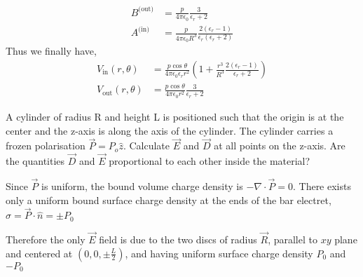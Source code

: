 \documentclass[../main.tex]{subfiles}
\begin{document}
\begin{questions}
\begin{solution}
\begin{align}
		B^\text{(out)} &= \frac{p}{4\pi\epsilon_0}\frac{3}{\epsilon_r+2}\\
		A^\text{(in)} &= \frac{p}{4\pi\epsilon_0R^3}\frac{2(\epsilon_r-1)}{\epsilon_r(\epsilon_r+2)}        
	\end{align}
	Thus we finally have,
	\begin{align}
		V_\text{in}(r,\theta) &= \frac{p\cos\theta}{4\pi\epsilon_0\epsilon_rr^2}\left(1 + \frac{r^3}{R^3}\frac{2(\epsilon_r-1)}{\epsilon_r+2}\right)\\
		V_\text{out}(r,\theta) &= \frac{p\cos\theta}{4\pi\epsilon_0 r^2}\frac{3}{\epsilon_r+2}
	\end{align}
\end{solution}
	
\question A cylinder of radius R and height L is positioned such that the origin is at the center and the z-axis is along the axis of the cylinder. The cylinder carries a frozen polarisation $\vec{P} = {P_o}\hat{z}$. Calculate $\vec{E}$ and $\vec{D}$ at all points on the z-axis. Are the quantities $\vec{D}$ and $\vec{E}$ proportional to each other inside the material?

\begin{solution}
	Since $\vec{P}$ is uniform, the bound volume charge density is $-\nabla\cdot\vec{P}=0$. There exists only a uniform bound surface charge density at the ends of the bar electret, $\sigma=\vec{P}\cdot\hat{n}=\pm P_0$

	Therefore the only $\vec{E}$ field is due to the two discs of radius $\vec{R}$, parallel to $xy$ plane and centered at $(0,0,\pm\frac{L}{2})$, and having uniform surface charge density $P_0$ and $-P_0$
	\begin{figure}[H]
		\centering
\end{figure}
\end{solution}
\end{questions}
\end{document}
